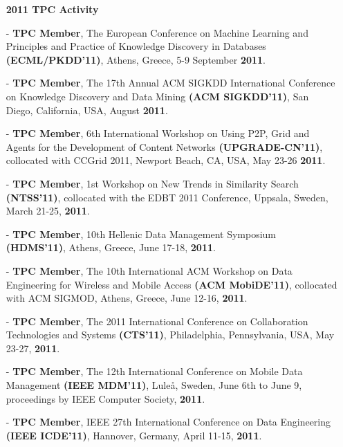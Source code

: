 \documentclass[10pt]{article}
\begin{document}
\begin{itemize}
\begin{itemize}
%
\vspace{0.1in}
\item[]{\bf 2011 TPC Activity\hrulefill }
%
\item[-] {\bf TPC Member}, The European Conference on Machine Learning and Principles and Practice of Knowledge Discovery in Databases {\bf (ECML/PKDD'11)}, Athens, Greece, 5-9 September {\bf 2011}.
\item[-] {\bf TPC Member}, The 17th Annual ACM SIGKDD International Conference on Knowledge Discovery and Data Mining {\bf (ACM SIGKDD'11)}, San Diego, California, USA, August {\bf 2011}.
\item[-] {\bf TPC Member}, 6th International Workshop on Using P2P, Grid and Agents for the Development of Content Networks {\bf (UPGRADE-CN'11)}, collocated with CCGrid 2011, Newport Beach, CA, USA, May 23-26 {\bf 2011}.
\item[-] {\bf TPC Member}, 1st Workshop on New Trends in Similarity Search {\bf (NTSS'11)}, collocated with the EDBT 2011 Conference, Uppsala, Sweden, March 21-25, {\bf 2011}.
\item[-] {\bf TPC Member}, 10th Hellenic Data Management Symposium {\bf (HDMS'11)}, Athens, Greece, June 17-18, {\bf 2011}.
\item[-] {\bf TPC Member}, The 10th International ACM Workshop on Data Engineering for Wireless and Mobile Access {\bf (ACM MobiDE'11)}, collocated with ACM SIGMOD, Athens, Greece, June 12-16, {\bf 2011}.
\item[-] {\bf TPC Member}, The  2011 International Conference on Collaboration Technologies and
Systems {\bf (CTS'11)},  Philadelphia, Pennsylvania, USA, May 23-27, {\bf 2011}.
\item[-] {\bf TPC Member}, The 12th International Conference on Mobile Data Management {\bf (IEEE MDM'11)}, Lule\aa, Sweden, June 6th to June 9, proceedings by IEEE Computer Society, {\bf 2011}.
\item[-] {\bf TPC Member}, IEEE 27th International Conference on Data Engineering {\bf (IEEE ICDE'11)}, Hannover, Germany, April 11-15, {\bf 2011}.


\end{itemize}
\end{itemize}
\end{document}
